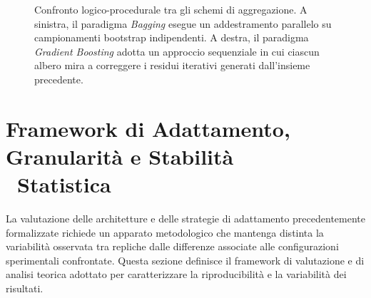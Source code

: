 \begin{figure}[H]
    \caption{Confronto logico-procedurale tra gli schemi di aggregazione. A sinistra, il paradigma \textit{Bagging} esegue un addestramento parallelo su campionamenti bootstrap indipendenti. A destra, il paradigma \textit{Gradient Boosting} adotta un approccio sequenziale in cui ciascun albero mira a correggere i residui iterativi generati dall'insieme precedente.}
    \label{fig:bagging_vs_boosting}
\end{figure}

\section[Framework di Adattamento, Granularità e Stabilità Statistica]{Framework di Adattamento, Granularità e Stabilità \\\ Statistica}
\label{sec:framework_adattamento}

La valutazione delle architetture e delle strategie di adattamento precedentemente formalizzate richiede un apparato metodologico che mantenga distinta la variabilità osservata tra repliche dalle differenze associate alle configurazioni sperimentali confrontate. 
Questa sezione definisce il framework di valutazione e di analisi teorica adottato per caratterizzare la riproducibilità e la variabilità dei risultati.

